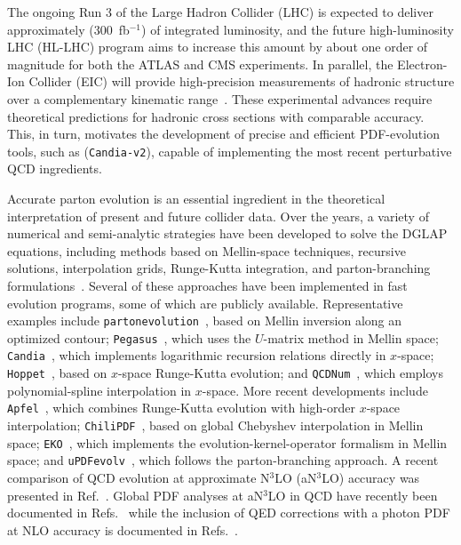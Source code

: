 \documentclass[preprint,12pt]{elsarticle}
\begin{document}
The ongoing Run 3 of the Large Hadron Collider (LHC) is expected to deliver approximately (300~fb$^{-1}$) of integrated luminosity, and the future high-luminosity LHC (HL-LHC) program aims to increase this amount by about one order of magnitude for both the ATLAS and CMS experiments. In parallel, the Electron-Ion Collider (EIC) will provide high-precision measurements of hadronic structure over a complementary kinematic range~\cite{AbdulKhalek:2021gbh}. These experimental advances require theoretical predictions for hadronic cross sections with comparable accuracy. This, in turn, motivates the development of precise and efficient PDF-evolution tools, such as (\texttt{Candia-v2}), capable of implementing the most recent perturbative QCD ingredients.

Accurate parton evolution is an essential ingredient in the theoretical interpretation of present and future collider data. Over the years, a variety of numerical and semi-analytic strategies have been developed to solve the DGLAP equations, including methods based on Mellin-space techniques, recursive solutions, interpolation grids, Runge-Kutta integration, and parton-branching formulations~\cite{Furmanski:1981cw,Rossi:1983xz,DaLuzVieira:1990xk,Kumano:1992vd,Pascaud:1994vx,Miyama:1995bd,Pascaud:1996ci,Kosower:1997hg,Hirai:1997gb,Blumlein:1997em,Coriano:1998wj,Santorelli:1998yt,Ratcliffe:2000kp,Weinzierl:2002mv,Cafarella:2005zj,Jadach:2005bf,Guzzi:2006wx,Jadach:2007qa,Simonelli:2024vyh}. Several of these approaches have been implemented in fast evolution programs, some of which are publicly available. Representative examples include \texttt{partonevolution}~\cite{Weinzierl:2002mv}, based on Mellin inversion along an optimized contour; \texttt{Pegasus}~\cite{Vogt:2004ns}, which uses the $U$-matrix method in Mellin space; \texttt{Candia}~\cite{Cafarella:2008du,candiav1}, which implements logarithmic recursion relations directly in $x$-space; \texttt{Hoppet}~\cite{Salam:2008qg,Karlberg:2026kte}, based on $x$-space Runge-Kutta evolution; and \texttt{QCDNum}~\cite{Botje:2010ay}, which employs polynomial-spline interpolation in $x$-space. More recent developments include \texttt{Apfel}~\cite{Bertone:2013vaa,Bertone:2017gds}, which combines Runge-Kutta evolution with high-order $x$-space interpolation; \linebreak \texttt{ChiliPDF}~\cite{Diehl:2021gvs}, based on global Chebyshev interpolation in Mellin space; \texttt{EKO}~\cite{Candido:2022tld}, which implements the evolution-kernel-operator formalism in Mellin space; and \texttt{uPDFevolv}~\cite{Hautmann:2014uua,Jung:2024uwc}, which follows the parton-branching approach. 
A recent comparison of QCD evolution at approximate N$^3$LO (aN$^3$LO) accuracy was presented in Ref.~\cite{Cooper-Sarkar:2024crx}.
%
Global PDF analyses at aN$^3$LO in QCD have recently been documented in Refs.~\cite{NNPDF:2024nan,McGowan:2022nag} while the inclusion of QED corrections with a photon PDF at NLO accuracy is documented in Refs.~\cite{Cridge:2023ryv,Ball:2025xgq}.
\end{document}
